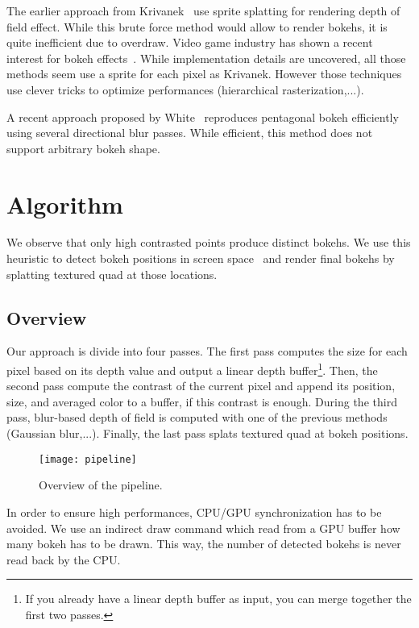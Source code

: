 The earlier approach from Krivanek~\cite{Krivanek03} use sprite splatting for rendering depth of field effect. While this brute force method would allow to render bokehs, it is quite inefficient due to overdraw. Video game industry has shown a recent interest for bokeh effects~\cite{Sousa11,Futurmark11,Mittring11}. While implementation details are uncovered, all those methods seem use a sprite for each pixel as Krivanek. However those techniques use clever tricks to optimize performances (hierarchical rasterization,...). 

A recent approach proposed by White~\cite{White11} reproduces pentagonal bokeh efficiently using several directional blur passes. While efficient, this method does not support arbitrary bokeh shape.

\section{Algorithm}
We observe that only high contrasted points produce distinct bokehs. We use this heuristic to detect bokeh positions in screen space~\cite{Pettineo11} and render final bokehs by splatting textured quad at those locations.

\subsection{Overview}
Our approach is divide into four passes. The first pass computes the \coc size for each pixel based on its depth value and output a linear depth buffer\footnote{If you already have a linear depth buffer as input, you can merge together the first two passes.}. Then, the second pass compute the contrast of the current pixel and append its position, \coc size, and averaged color to a buffer, if this contrast is enough. During the third pass, blur-based depth of field is computed with one of the previous methods (Gaussian blur,...). Finally, the last pass splats textured quad at bokeh positions.

	\begin{figure}[htb]\centering
	\texttt{[image: pipeline]}
	\caption{Overview of the pipeline.}
	\label{YourName:fig1}
	\end{figure}

In order to ensure high performances, CPU/GPU synchronization has to be avoided. We use an indirect draw command which read from a GPU buffer how many bokeh has to be drawn. This way, the number of detected bokehs is never read back by the CPU.

